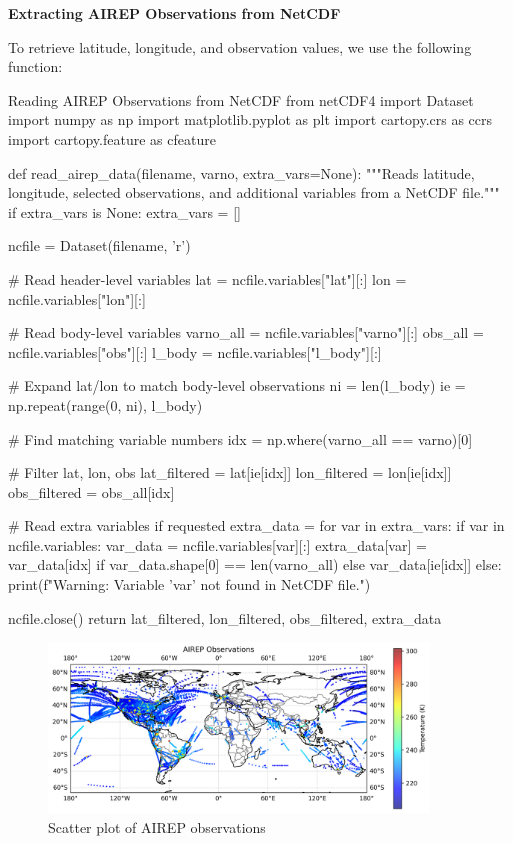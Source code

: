 \textbf{Extracting AIREP Observations from NetCDF}

To retrieve latitude, longitude, and observation values, we use the following function:

\begin{codeonly}{Reading AIREP Observations from NetCDF}
from netCDF4 import Dataset
import numpy as np
import matplotlib.pyplot as plt
import cartopy.crs as ccrs
import cartopy.feature as cfeature

def read_airep_data(filename, varno, extra_vars=None):
    """Reads latitude, longitude, selected observations, and additional variables from a NetCDF file."""
    if extra_vars is None:
        extra_vars = []

    ncfile = Dataset(filename, 'r')
    
    # Read header-level variables
    lat = ncfile.variables["lat"][:]
    lon = ncfile.variables["lon"][:]
    
    # Read body-level variables
    varno_all = ncfile.variables["varno"][:]
    obs_all = ncfile.variables["obs"][:]
    l_body = ncfile.variables["l_body"][:]

    # Expand lat/lon to match body-level observations
    ni = len(l_body)
    ie = np.repeat(range(0, ni), l_body)
    
    # Find matching variable numbers
    idx = np.where(varno_all == varno)[0]
    
    # Filter lat, lon, obs
    lat_filtered = lat[ie[idx]]
    lon_filtered = lon[ie[idx]]
    obs_filtered = obs_all[idx]

    # Read extra variables if requested
    extra_data = {}
    for var in extra_vars:
        if var in ncfile.variables:
            var_data = ncfile.variables[var][:]
            extra_data[var] = var_data[idx] if var_data.shape[0] == len(varno_all) else var_data[ie[idx]]
        else:
            print(f"Warning: Variable '{var}' not found in NetCDF file.")

    ncfile.close()
    return lat_filtered, lon_filtered, obs_filtered, extra_data

\end{codeonly}

\begin{figure}[ht]
    \centering
    \includegraphics[width=0.9\textwidth]{images/airep.png}
    \caption{Scatter plot of AIREP observations}
    \label{fig:airep_plot}
\end{figure}

